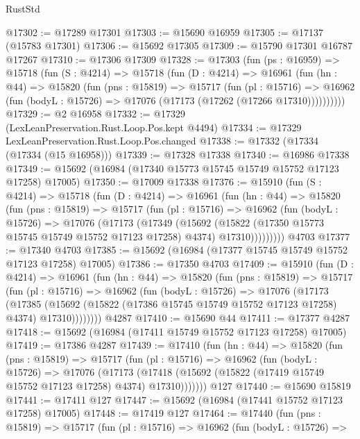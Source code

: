 \begin{lexlean}{RustStd}
\begin{coremodule}
@17302 := @17289 @17301
@17303 := @15690 @16959
@17305 := @17137 (@15783 @17301)
@17306 := @15692 @17305
@17309 := @15790 @17301 @16787 @17267
@17310 := @17306 @17309
@17328 := @17303
    (fun (ps : @16959) =>
    @15718
      (fun (S : @4214) =>
      @15718
        (fun (D : @4214) =>
        @16961
          (fun (hn : @44) =>
          @15820
            (fun (pns : @15819) =>
            @15717
              (fun (pl : @15716) =>
              @16962 (fun (bodyL : @15726) => @17076 (@17173 (@17262 (@17266 @17310))))))))))
@17329 := @2 @16958
@17332 := @17329 (LexLeanPreservation.Rust.Loop.Pos.kept @4494)
@17334 := @17329 LexLeanPreservation.Rust.Loop.Pos.changed
@17338 := @17332 (@17334 (@17334 (@15 @16958)))
@17339 := @17328 @17338
@17340 := @16986 @17338
@17349 := @15692 (@16984 (@17340 @15773 @15745 @15749 @15752 @17123 @17258) @17005)
@17350 := @17009 @17338
@17376 := @15910
    (fun (S : @4214) =>
    @15718
      (fun (D : @4214) =>
      @16961
        (fun (hn : @44) =>
        @15820
          (fun (pns : @15819) =>
          @15717
            (fun (pl : @15716) =>
            @16962
              (fun (bodyL : @15726) =>
              @17076
                (@17173
                  (@17349
                    (@15692
                      (@15822 (@17350 @15773 @15745 @15749 @15752 @17123 @17258) @4374)
                      @17310)))))))))
    @4703
@17377 := @17340 @4703
@17385 := @15692 (@16984 (@17377 @15745 @15749 @15752 @17123 @17258) @17005)
@17386 := @17350 @4703
@17409 := @15910
    (fun (D : @4214) =>
    @16961
      (fun (hn : @44) =>
      @15820
        (fun (pns : @15819) =>
        @15717
          (fun (pl : @15716) =>
          @16962
            (fun (bodyL : @15726) =>
            @17076
              (@17173
                (@17385
                  (@15692 (@15822 (@17386 @15745 @15749 @15752 @17123 @17258) @4374) @17310))))))))
    @4287
@17410 := @15690 @44
@17411 := @17377 @4287
@17418 := @15692 (@16984 (@17411 @15749 @15752 @17123 @17258) @17005)
@17419 := @17386 @4287
@17439 := @17410
    (fun (hn : @44) =>
    @15820
      (fun (pns : @15819) =>
      @15717
        (fun (pl : @15716) =>
        @16962
          (fun (bodyL : @15726) =>
          @17076
            (@17173
              (@17418 (@15692 (@15822 (@17419 @15749 @15752 @17123 @17258) @4374) @17310)))))))
    @127
@17440 := @15690 @15819
@17441 := @17411 @127
@17447 := @15692 (@16984 (@17441 @15752 @17123 @17258) @17005)
@17448 := @17419 @127
@17464 := @17440
    (fun (pns : @15819) =>
    @15717
      (fun (pl : @15716) =>
      @16962
        (fun (bodyL : @15726) =>

\end{coremodule}
\end{lexlean}
